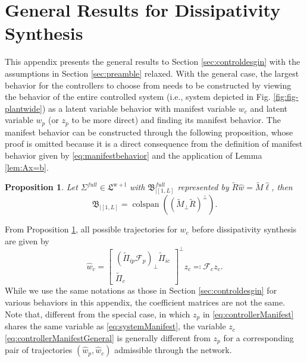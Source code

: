 \documentclass[11pt,print,draftcls,onecolumn,romanappendices]{ieeecolor}
\newtheorem{prop}[thm]{Proposition}
\DeclareMathOperator{\cs}{colspan}
\newcommand{\LTI}[1]{\mathfrak{L}^{#1}}
\newcommand{\revise}[1]{{\color{black} #1}}
\newcommand{\B}{\mathfrak{B}}
\newcommand{\F}{\mathcal{F}}
\newcommand{\bint}[1]{{|[#1]}}
\begin{document}
\appendices
\revise{\section{General Results for Dissipativity Synthesis}\label{appx:controlGeneral}
This appendix presents the general results to Section \ref{sec:controldesgin} with the assumptions in Section \ref{sec:preamble} relaxed. With the general case, the largest behavior for the controllers to choose from needs to be constructed by viewing the behavior of the entire controlled system (i.e., system depicted in Fig. \ref{fig:fig-plantwide}) as a latent variable behavior with manifest variable $w_c$ and latent variable $w_p$ (or $z_p$ to be more direct) and finding its manifest behavior. The manifest behavior can be constructed through the following proposition, whose proof is omitted because it is a direct consequence from the definition of manifest behavior given by \eqref{eq:manifestbehavior} and the application of Lemma \ref{lem:Ax=b}.
\begin{prop}\label{prop:manifestLstep}
	Let $\Sigma^{full}\in\LTI{\mathrm{w+l}}$ with $\B^{full}_\bint{1,L}$ represented by  $\widetilde{R}\hat{w}=\widetilde{M}\hat{\ell}$, then 
	\begin{equation}
	    \B_\bint{1,L}=\cs\left((\widetilde{M}_\perp\widetilde{R})^\perp\right).
	\end{equation}
\end{prop}

From Proposition \ref{prop:manifestLstep}, all possible trajectories for $w_c$ before dissipativity synthesis are given by
\begin{equation}\label{eq:controllerManifestGeneral}
    \hat{w}_c=\begin{bmatrix}
        (\widetilde{\Pi}_{ip}\F_p)_\perp \widetilde{\Pi}_{ic}\\ \widetilde{\Pi}_c
    \end{bmatrix}^\perp z_c\eqqcolon\F_cz_c.
\end{equation}
While we use the same notations as those in Section \ref{sec:controldesgin} for various behaviors in this appendix, the coefficient matrices are not the same. Note that, different from the special case, in which $z_p$ in \eqref{eq:controllerManifest} shares the same variable as \eqref{eq:systemManifest}, the variable $z_c$ \eqref{eq:controllerManifestGeneral} is generally different from $z_p$ for a corresponding pair of trajectories $(\hat{w}_p,\hat{w}_c)$ admissible through the network.

}
\end{document}
